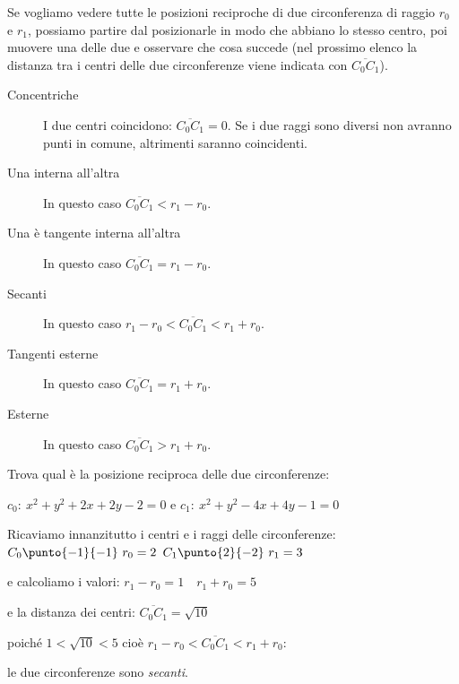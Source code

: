 Se vogliamo vedere tutte le posizioni reciproche di due circonferenza  
di raggio \(r_0\) e \(r_1\), possiamo partire dal posizionarle in modo che 
abbiano lo stesso centro, poi muovere una delle due e osservare che cosa 
succede (nel prossimo elenco la distanza tra i centri delle due circonferenze 
viene indicata con \(\overline{C_0 C_1}\)).

\begin{description} %
 \item [Concentriche]
I due centri coincidono: \(\overline{C_0 C_1} = 0\).
Se i due raggi sono diversi non avranno punti in comune, altrimenti saranno 
coincidenti.
 \item [Una interna all'altra]
In questo caso \(\overline{C_0 C_1} < r_1 - r_0\).
 \item [Una è tangente interna all'altra]
In questo caso \(\overline{C_0 C_1} = r_1 - r_0\).
 \item [Secanti]
In questo caso \(r_1 - r_0 < \overline{C_0 C_1} < r_1 + r_0\).
 \item [Tangenti esterne]
In questo caso \(\overline{C_0 C_1} = r_1 + r_0\).
 \item [Esterne]
In questo caso \(\overline{C_0 C_1} > r_1 + r_0\).
\end{description}

\begin{esempio}
Trova qual è la posizione reciproca delle due circonferenze:

\(c_0:~x^2 + y^2 +2x +2y -2 = 0\) e \(c_1:~x^2 + y^2 -4x +4y -1 = 0\) 

Ricaviamo innanzitutto i centri e i raggi delle circonferenze: \\
\(C_0 \punto{-1}{-1} ~ r_0 = 2\) \qquad 
\(C_1 \punto{2}{-2} ~ r_1 = 3\) 

e calcoliamo i valori: \quad \(r_1 - r_0 = 1 \quad r_1 + r_0 = 5\) 

e la distanza dei centri: \quad \(\overline{C_0 C_1} = \sqrt{10}\) 

poiché \quad \(1 < \sqrt{10} < 5\) cioè \quad 
\(r_1 - r_0 < \overline{C_0 C_1} < r_1 + r_0\): 

le due circonferenze sono \emph{secanti}.
\end{esempio}

